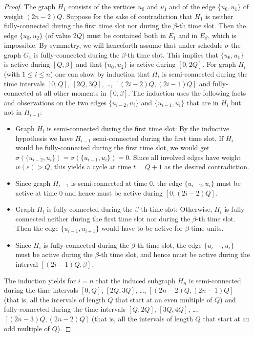 \documentclass[runningheads]{llncs}
\newcommand{\set}[1]{\{ #1 \}}
\begin{document}
\begin{proof}
The graph $H_1$ consists of the vertices $u_0$ and $u_1$ and of the edge $\{u_0, u_1\}$ of weight $(2n-2)Q$.
Suppose for the sake of contradiction that $H_1$ is neither fully-connected during the first time slot
nor during the $\beta$-th time slot.
Then the edge $\{u_0, u_2\}$ (of value $2Q$) must be contained both in $E_1$ and in $E_{\beta}$, which is impossible.
By symmetry, we will henceforth assume that under schedule $\sigma$ the graph $G_1$ is fully-connected 
during the $\beta$-th time slot.
This implies that $\{u_0, u_1\}$ is active during $[Q,\beta]$ and that $\{u_0, u_2\}$ is active during $[0,2Q]$.
For graph $H_i$ (with $1\le i\le n$) one can show by induction that $H_i$ is semi-connected
during the time intervals $[0,Q]$, $[2Q,3Q]$, \dots, $[(2i-2)Q,(2i-1)Q]$ and fully-connected at all
other moments in $[0,\beta]$.
The induction uses the following facts and observations on the two edges $\set{u_{i-2}, u_i}$ 
and $\set{u_{i-1},u_i}$ that are in $H_i$ but not in $H_{i-1}$:
\begin{itemize}
\item Graph $H_i$ is semi-connected during the first time slot:
By the inductive hypothesis we have $H_{i-1}$ semi-connected during the first time slot.
If $H_i$ would be fully-connected during the first time slot, we would get
$\sigma(\{u_{i-2}, u_i\}) = \sigma(\{u_{i-1}, u_i\})=0$. 
Since all involved edges have weight $w(e)>Q$, this yields a cycle at time $t=Q+1$ as the desired contradiction.
\item Since graph $H_{i-1}$ is semi-connected at time $0$, the edge $\{u_{i-2},u_i\}$ must be active at 
time $0$ and hence must be active during $[0,(2i-2)Q]$.
\item Graph $H_i$ is fully-connected during the $\beta$-th time slot:
Otherwise, $H_i$ is fully-connected neither during the first time slot nor during the $\beta$-th time slot. 
Then the edge $\{u_{i-1},u_{i+1}\}$ would have to be active for $\beta$ time units.
\item Since $H_i$ is fully-connected during the $\beta$-th time slot, the edge $\{u_{i-1},u_i\}$ must be 
active during the $\beta$-th time slot, and hence must be active during the interval $[(2i-1)Q,\beta]$.
\end{itemize}
The induction yields for $i=n$ that the induced subgraph $H_n$ is semi-connected during the time intervals 
$[0,Q]$, $[2Q,3Q]$, \dots, $[(2n-2)Q,(2n-1)Q]$ (that is, all the intervals of length $Q$ that start at an 
even multiple of $Q$)
and fully-connected during the time intervals $[Q,2Q]$, $[3Q,4Q]$, \dots, $[(2n-3)Q,(2n-2)Q]$ (that is, all the 
intervals of length $Q$ that start at an odd multiple of $Q$).


\end{proof}
\end{document}

